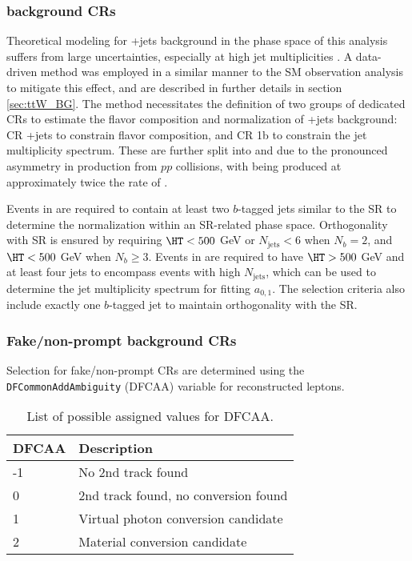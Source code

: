 \documentclass[../thesis.tex]{subfiles}
\begin{document}
\subsubsection*{\ttW background \acs{CR}s}
Theoretical modeling for \ttW+jets background in the phase space of this analysis suffers from large uncertainties, especially at high jet multiplicities \citep{bg:ttH_ttW_ML}.
A data-driven method was employed in a similar manner to the \acs{SM} \tttt observation analysis \citep{tttt_obs} to mitigate this effect, and are described in further details in section \ref{sec:ttW_BG}. The method necessitates the definition of two groups of dedicated \acs{CR}s to estimate the flavor composition and normalization of \ttW+jets background: \acs{CR} \ttW+jets to constrain flavor composition, and \acs{CR} 1b to constrain the jet multiplicity spectrum. These are further split into \CRttWpm and \CRonebpm due to the pronounced asymmetry in \ttW production from $pp$ collisions, with \ttWplus being produced at approximately twice the rate of \ttWminus \citep{ana:ttW_meas}.

Events in \CRttWpm are required to contain at least two $b$-tagged jets similar to the SR to determine the \ttW normalization within an SR-related phase space. Orthogonality with SR is ensured by requiring $\HT<500$ GeV or $N_\mathrm{jets}<6$ when $N_b=2$, and $\HT<500$ GeV when $N_b\geq 3$. Events in \CRonebpm are required to have $\HT>500$ GeV and at least four jets to encompass events with high $N_\mathrm{jets}$, which can be used to determine the \ttW jet multiplicity spectrum for fitting $a_{0,1}$. The selection criteria also include exactly one $b$-tagged jet to maintain orthogonality with the \acs{SR}.

\subsubsection*{Fake/non-prompt background CRs}
Selection for fake/non-prompt \acs{CR}s are determined using the \verb|DFCommonAddAmbiguity| (DFCAA) variable for reconstructed leptons.\\

\begin{table}[!htbp]
\centering
\caption{\label{tab:ana:DFCAA}List of possible assigned values for DFCAA.}%
\begin{tabular}{p{2cm}|l}
\toprule\toprule
DFCAA & Description \\
\midrule
-1			& No 2nd track found \\
0			& 2nd track found, no conversion found \\
1			& Virtual photon conversion candidate \\
2			& Material conversion candidate\\
\bottomrule\bottomrule
\end{tabular}
\end{table}
\end{document}
